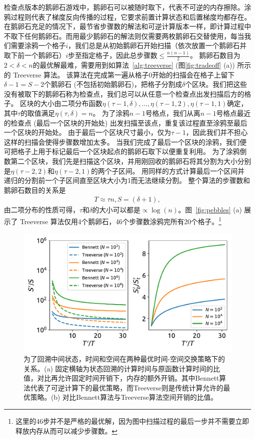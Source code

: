 \documentclass[A4,twoside,UTF8]{ctexart}
\begin{document}
检查点版本的鹅卵石游戏中，鹅卵石可以被随时取下，代表不可逆的内存擦除。涂鸦过程则代表了梯度反向传播的过程，它要求前置计算状态和后置梯度均都存在。在鹅卵石充足的情况下，最节省步骤数的解法和可逆计算版本一样，即计算过程中不取下任何鹅卵石。而用最少鹅卵石的解法则仅需要两枚鹅卵石交替使用，每当我们需要涂鸦一个格子$i$，我们总是从初始鹅卵石开始扫描（依次放置一个鹅卵石并取下前一个鹅卵石）$i$步至指定格子，因此总步骤数$\leq\frac{n(n-1)}{2}$。
鹅卵石数目为$2<\delta<n$的最优解最难，需要用到如算法~\ref{alg:treeverse} (图\ref{fig:tradeoff} (a)) 所示的 Treeverse 算法。
该算法在完成第一遍从格子$0$开始的扫描会在格子上留下$\delta-1=S-2$个鹅卵石 (不包括初始鹅卵石)，把格子分割成$\delta$个区块。我们把这些没有被取下的鹅卵石称为检查点，我们总可以从任意一个检查点出发扫描后方的格子。
区块的大小由二项分布函数$\eta(\tau-1, \delta), \ldots, \eta(\tau-1, 2), \eta(\tau-1, 1)$确定，其中$\tau$的取值满足$\eta(\tau, \delta) = n$。
为了涂鸦$n-1$号格点，我们从离$n-1$号格点最近的检查点 (最后一个区块的开始处) 出发扫描至该点，重复该过程直至涂鸦至最后一个区块的开始处。
由于最后一个区块尺寸最小，仅为$\tau-1$，因此我们并不担心这样的扫描会使得步骤数增加太多。
当我们完成了最后一个区块的涂鸦，我们便可把格子上用于标记最后一个区块起点的鹅卵石取下以便重复利用。
为了涂鸦倒数第二个区块，我们先是扫描这个区块，并用刚回收的鹅卵石将其分割为大小分别是$\eta(\tau-2, 2)$和$\eta(\tau-2, 1)$的两个子区间。
用同样的方式计算最后一个区间并递归的分割前一个子区间直至区块大小为1而无法继续分割。
整个算法的步骤数和鹅卵石数目的关系是
\begin{align}
    T \approx \tau n, S = (\delta+1),
\end{align}
由二项分布的性质可得，$\tau$和$\delta$的大小可以都是$\propto\log(n)$。图~\ref{fig:pebbles} (a) 展示了 Treeverse 算法仅用4个鹅卵石，46个步骤数涂鸦完所有20个格子。\footnote{这里的46步并不是严格的最优解，因为图中扫描过程的最后一步并不需要立即释放内存从而可以减少步骤数。}

\begin{figure}[h]
\centering
\includegraphics[width=0.8\columnwidth]{./fig1.pdf}
    \caption{为了回溯中间状态，时间和空间在两种最优时间-空间交换策略下的关系。(a) 固定横轴为状态回溯的计算时间与原函数计算时间的比值，对比再允许固定时间开销下，内存的额外开销。其中Bennett算法代表了可逆计算下的最优策略，而Treeverse则是传统计算允许的最优策略。(b) 对比Bennett算法与Treeverse算法空间开销的比值。\label{fig:timespace}}
\end{figure}
\end{document}
